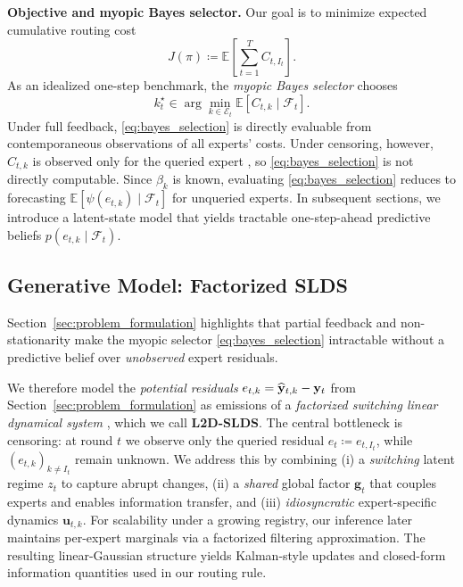 \textbf{Objective and myopic Bayes selector.}
Our goal is to minimize expected cumulative routing cost
\begin{equation}
\label{eq:routing_objective}
    J(\pi) \coloneqq \mathbb{E}\left[\sum_{t=1}^T C_{t,I_t}\right].
\end{equation}
As an idealized one-step benchmark, the \emph{myopic Bayes selector} chooses
\begin{equation}
\label{eq:bayes_selection}
    k_t^{\star} \in \arg\min_{k\in\mathcal{E}_t} \mathbb{E}\left[C_{t,k} \mid \mathcal{F}_t\right].
\end{equation}
Under full feedback, \eqref{eq:bayes_selection} is directly evaluable from contemporaneous observations
of all experts' costs. Under censoring, however, \(C_{t,k}\) is observed only for the queried expert
\citep{neu2010online}, so \eqref{eq:bayes_selection} is not directly computable.
Since \(\beta_k\) is known, evaluating \eqref{eq:bayes_selection} reduces to forecasting
\(\mathbb{E}[\psi(e_{t,k})\mid \mathcal{F}_t]\) for unqueried experts. In subsequent sections, we introduce a latent-state model that yields tractable
one-step-ahead predictive beliefs \(p(e_{t,k}\mid \mathcal{F}_t)\).

\subsection{Generative Model: Factorized SLDS}
\label{sec:generative_model}

Section~\ref{sec:problem_formulation} highlights that partial feedback and non-stationarity make the
myopic selector \eqref{eq:bayes_selection} intractable without a predictive belief over \emph{unobserved}
expert residuals.

We therefore model the \emph{potential residuals} \(e_{t,k}=\widehat{\mathbf{y}}_{t,k}-\mathbf{y}_t\) from
Section~\ref{sec:problem_formulation} as emissions of a \emph{factorized switching linear dynamical
system} \citep{bengio1994input, linderman2016recurrent, hu2024modeling}, which we call \textbf{L2D-SLDS}.
The central bottleneck is censoring: at round \(t\) we observe only the queried residual
\(e_t\coloneqq e_{t,I_t}\), while \((e_{t,k})_{k\neq I_t}\) remain unknown. We
address this by combining (i) a \emph{switching} latent regime \(z_t\) to capture abrupt changes, (ii)
a \emph{shared} global factor \(\mathbf{g}_t\) that couples experts and enables information transfer,
and (iii) \emph{idiosyncratic} expert-specific dynamics \(\mathbf{u}_{t,k}\). For scalability under a
growing registry, our inference later maintains per-expert marginals via a factorized filtering
approximation. The resulting linear-Gaussian structure yields Kalman-style updates and closed-form
information quantities used in our routing rule.


